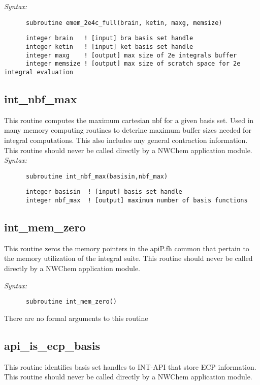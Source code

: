 {\it Syntax:} 
\begin{verbatim} 
      subroutine emem_2e4c_full(brain, ketin, maxg, memsize) 
\end{verbatim} 
\begin{verbatim} 
      integer brain   ! [input] bra basis set handle 
      integer ketin   ! [input] ket basis set handle 
      integer maxg    ! [output] max size of 2e integrals buffer 
      integer memsize ! [output] max size of scratch space for 2e integral evaluation 
\end{verbatim} 
\subsection{int\_nbf\_max} 
This routine computes the maximum cartesian nbf for a given basis 
set.  Used in many memory computing routines to deterine maximum 
buffer sizes needed for integral computations.  This also includes 
any general contraction information. 
This routine should never be called directly by a  
NWChem application module. 
{\it Syntax:} 
\begin{verbatim} 
      subroutine int_nbf_max(basisin,nbf_max) 
\end{verbatim} 
\begin{verbatim} 
      integer basisin  ! [input] basis set handle 
      integer nbf_max  ! [output] maximum number of basis functions 
\end{verbatim} 
\subsection{int\_mem\_zero} 
This routine zeros the memory pointers in the apiP.fh common 
that pertain to the memory utilization of the integral suite. 
This routine should never be called directly by a  
NWChem application module. 
 
{\it Syntax:} 
\begin{verbatim} 
      subroutine int_mem_zero() 
\end{verbatim} 
There are no formal arguments to this routine 
 
\subsection{api\_is\_ecp\_basis} 
This routine identifies basis set handles to INT-API  
that store ECP information. 
This routine should never be called directly by a  
NWChem application module. 
 
